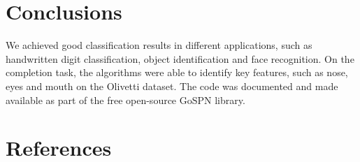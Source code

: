 \documentclass[10pt,a4paper]{article}
\begin{document}
\begin{multicols*}{2}
\section*{Conclusions}

We achieved good classification results in different applications, such as handwritten digit
classification, object identification and face recognition. On the completion task, the algorithms
were able to identify key features, such as nose, eyes and mouth on the Olivetti dataset. The code
was documented and made available as part of the free open-source GoSPN library.


\smallskip
\section*{References}
\vspace{0.1cm}

\AtNextBibliography{\fontsize{10pt}{12.0}\selectfont}
\printbibliography[heading=none]

\end{multicols*}
\end{document}
